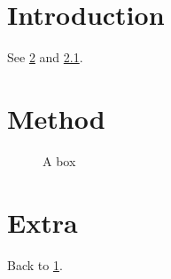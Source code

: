 \documentclass[parskip=half]{scrreprt}
\begin{document}
\tableofcontents
\chapter{Introduction}\label{ch:intro}
See \cref{ch:method} and \cref{fig:box}.
\chapter{Method}\label{ch:method}
\begin{figure}[h]\centering{}\caption{A box}\label{fig:box}\end{figure}
\appendix
\chapter{Extra}
Back to \cref{ch:intro}.
\end{document}
